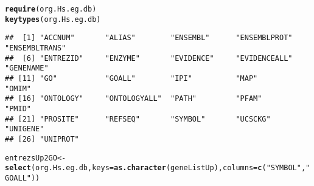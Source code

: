 \documentclass{article}\usepackage[]{graphicx}\usepackage[]{color}
\makeatletter
\newcommand{\hlstr}[1]{\textcolor[rgb]{0.192,0.494,0.8}{#1}}%
\newcommand{\hlstd}[1]{\textcolor[rgb]{0.345,0.345,0.345}{#1}}%
\newcommand{\hlkwb}[1]{\textcolor[rgb]{0.69,0.353,0.396}{#1}}%
\newcommand{\hlkwc}[1]{\textcolor[rgb]{0.333,0.667,0.333}{#1}}%
\newcommand{\hlkwd}[1]{\textcolor[rgb]{0.737,0.353,0.396}{\textbf{#1}}}%
\newenvironment{kframe}{%
 \def\at@end@of@kframe{}%
 \ifinner\ifhmode%
  \def\at@end@of@kframe{\end{minipage}}%
  \begin{minipage}{\columnwidth}%
 \fi\fi%
 \def\FrameCommand##1{\hskip\@totalleftmargin \hskip-\fboxsep
 \colorbox{shadecolor}{##1}\hskip-\fboxsep
     \hskip-\linewidth \hskip-\@totalleftmargin \hskip\columnwidth}%
 \MakeFramed {\advance\hsize-\width
   \@totalleftmargin\z@ \linewidth\hsize
   \@setminipage}}%
 {\par\unskip\endMakeFramed%
 \at@end@of@kframe}
\newenvironment{knitrout}{}{} %
\makeatother
\begin{document}
\begin{knitrout}
\color{fgcolor}\begin{kframe}
\begin{alltt}
\hlkwd{require}\hlstd{(org.Hs.eg.db)}
\hlkwd{keytypes}\hlstd{(org.Hs.eg.db)}
\end{alltt}
\begin{verbatim}
##  [1] "ACCNUM"       "ALIAS"        "ENSEMBL"      "ENSEMBLPROT"  "ENSEMBLTRANS"
##  [6] "ENTREZID"     "ENZYME"       "EVIDENCE"     "EVIDENCEALL"  "GENENAME"    
## [11] "GO"           "GOALL"        "IPI"          "MAP"          "OMIM"        
## [16] "ONTOLOGY"     "ONTOLOGYALL"  "PATH"         "PFAM"         "PMID"        
## [21] "PROSITE"      "REFSEQ"       "SYMBOL"       "UCSCKG"       "UNIGENE"     
## [26] "UNIPROT"
\end{verbatim}
\begin{alltt}
\hlstd{entrezsUp2GO} \hlkwb{<-} \hlkwd{select}\hlstd{(org.Hs.eg.db,} \hlkwc{keys} \hlstd{=} \hlkwd{as.character}\hlstd{(geneListUp),} \hlkwc{columns}\hlstd{=}\hlkwd{c}\hlstd{(}\hlstr{"SYMBOL"}\hlstd{,} \hlstr{"GOALL"}\hlstd{))}
\end{alltt}



\end{kframe}
\end{knitrout}
\end{document}

